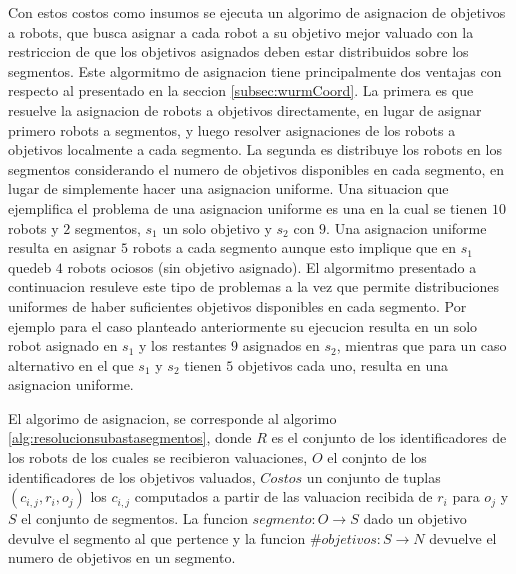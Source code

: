 Con estos costos como insumos se ejecuta un algorimo de asignacion de objetivos
a robots, que busca asignar a cada robot a su objetivo mejor valuado con la
restriccion de que los objetivos asignados deben estar distribuidos sobre los
segmentos. Este algormitmo de asignacion tiene principalmente dos ventajas con
respecto al presentado en la seccion \ref{subsec:wurmCoord}. La primera es que
resuelve la asignacion de robots a objetivos directamente, en lugar de asignar
primero robots a segmentos, y luego resolver asignaciones de los robots a
objetivos localmente a cada segmento. La segunda es distribuye los robots en
los segmentos considerando el numero de objetivos disponibles en cada segmento,
en lugar de simplemente hacer una asignacion uniforme. Una situacion que
ejemplifica el problema de una asignacion uniforme es una en la cual se tienen
$10$ robots y $2$ segmentos, $s_1$ un solo objetivo y $s_2$ con $9$. Una
asignacion uniforme resulta en asignar $5$ robots a cada segmento aunque esto
implique que en $s_1$ quedeb $4$ robots ociosos (sin objetivo asignado). El
algormitmo presentado a continuacion resuleve este tipo de problemas a la vez
que permite distribuciones uniformes de haber suficientes objetivos disponibles
en cada segmento. Por ejemplo para el caso planteado anteriormente su ejecucion
resulta en un solo robot asignado en $s_1$ y los restantes $9$ asignados en
$s_2$, mientras que para un caso alternativo en el que $s_1$ y $s_2$ tienen $5$
objetivos cada uno, resulta en una asignacion uniforme.

El algorimo de asignacion, se corresponde al algorimo
\ref{alg:resolucionsubastasegmentos}, donde $R$ es el conjunto de los
identificadores de los robots de los cuales se recibieron valuaciones, $O$ el
conjnto de los identificadores de los objetivos valuados, $Costos$ un conjunto
de tuplas $(c_{i,j},r_i,o_j)$ los $c_{i,j}$ computados a partir de las
valuacion recibida de $r_i$ para $o_j$ y $S$ el conjunto de
segmentos. La funcion $segmento : O \rightarrow S$ dado un objetivo devulve el
segmento al que pertence y la funcion $\#objetivos : S \rightarrow N$ devuelve
el numero de objetivos en un segmento.

\vspace{1cm}
  
